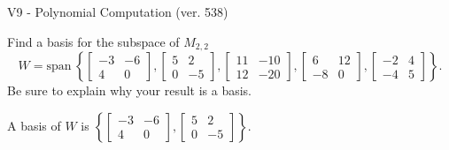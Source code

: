 \begin{exercise}
  \begin{exerciseTitle}V9 - Polynomial Computation (ver. 538)\end{exerciseTitle}
  \begin{exerciseStatement}
    Find a basis for the subspace of \(M_{2,2}\) 
\[W=\mathrm{span}\ \left\{\left[\begin{array}{cc}
-3 & -6 \\
4 & 0
\end{array}\right] , \left[\begin{array}{cc}
5 & 2 \\
0 & -5
\end{array}\right] , \left[\begin{array}{cc}
11 & -10 \\
12 & -20
\end{array}\right] , \left[\begin{array}{cc}
6 & 12 \\
-8 & 0
\end{array}\right] , \left[\begin{array}{cc}
-2 & 4 \\
-4 & 5
\end{array}\right]\right\}.\]
 Be sure to explain why your result is a basis.


  \end{exerciseStatement}
  \begin{exerciseAnswer}
   A basis of \(W\) is  \(\left\{\left[\begin{array}{cc}
-3 & -6 \\
4 & 0
\end{array}\right] , \left[\begin{array}{cc}
5 & 2 \\
0 & -5
\end{array}\right]\right\}\).
  


  \end{exerciseAnswer}
\end{exercise}